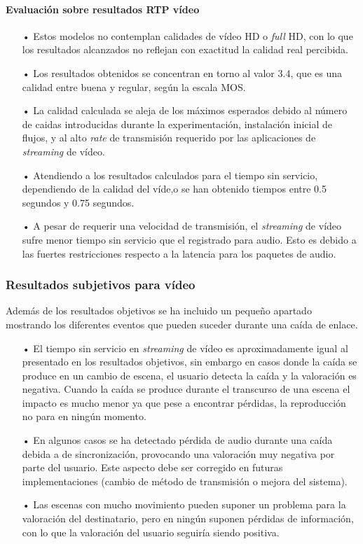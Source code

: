 \documentclass[a4paper,11pt]{book}
\begin{document}
\paragraph{Evaluación sobre resultados \ac{RTP} vídeo}

\begin{itemize}
\item[•] Estos modelos no contemplan calidades de vídeo \ac{HD} o \textit{full} \ac{HD}, con lo que los resultados alcanzados no reflejan con exactitud la calidad real percibida.
\item[•] Los resultados obtenidos se concentran en torno al valor 3.4, que es una calidad entre buena y regular, según la escala \ac{MOS}.
\item[•] La calidad calculada se aleja de los máximos esperados debido al número de caidas introducidas durante la experimentación, instalación inicial de flujos, y al alto \textit{rate} de transmisión requerido por las aplicaciones de \textit{streaming} de vídeo.
\item[•] Atendiendo a los resultados calculados para el tiempo sin servicio, dependiendo de la calidad del víde,o se han obtenido tiempos entre 0.5 segundos y 0.75 segundos.
\item[•] A pesar de requerir una velocidad de transmisión, el \textit{streaming} de vídeo sufre menor tiempo sin servicio que el registrado para audio. Esto es debido a las fuertes restricciones respecto a la latencia para los paquetes de audio.
\end{itemize}

\subsubsection{Resultados subjetivos para vídeo}

Además de los resultados objetivos se ha incluido un pequeño apartado mostrando los diferentes eventos que pueden suceder durante una caída de enlace.

\begin{itemize}
\item[•] El tiempo sin servicio en \textit{streaming} de vídeo es aproximadamente igual al presentado en los resultados objetivos, sin embargo en casos donde la caída se produce en un cambio de escena, el usuario detecta la caída y la valoración es negativa. Cuando la caída se produce durante el transcurso de una escena el impacto es mucho menor ya que pese a encontrar pérdidas, la reproducción no para en ningún momento.
\item[•] En algunos casos se ha detectado pérdida de audio durante una caída debida a de sincronización, provocando una valoración muy negativa por parte del usuario. Este aspecto debe ser corregido en futuras implementaciones (cambio de método de transmisión o mejora del sistema).
\item[•] Las escenas con mucho movimiento pueden suponer un problema para la valoración del destinatario, pero en ningún suponen pérdidas de información, con lo que la valoración del usuario seguiría siendo positiva.
\end{itemize}
\end{document}
